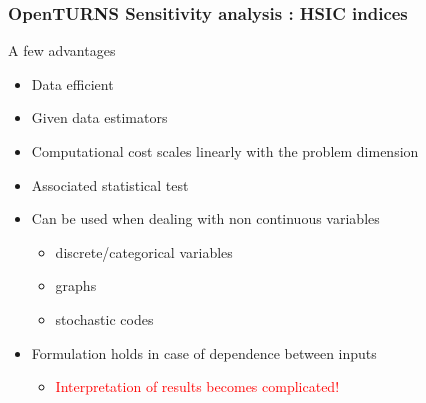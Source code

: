 \documentclass{beamer}
\begin{document}
  \begin{frame}
  \frametitle{OpenTURNS Sensitivity analysis : HSIC indices}
  
  \small
  \begin{block}{A few advantages}
  
  \begin{itemize}
    \item Data efficient
    \item Given data estimators
    \item Computational cost scales linearly with the problem dimension
    \item Associated statistical test
    \item Can be used when dealing with non continuous variables
    \begin{itemize}
    \item discrete/categorical variables
    \item graphs
    \item stochastic codes
    \end{itemize}
    \vspace{5pt}
    \item Formulation holds in case of dependence between inputs
    \begin{itemize}
    \item \textcolor{red}{Interpretation of results becomes complicated!}
    \end{itemize}
  \end{itemize}
  
  \end{block}
  
  \end{frame}
  
  
\end{document}
